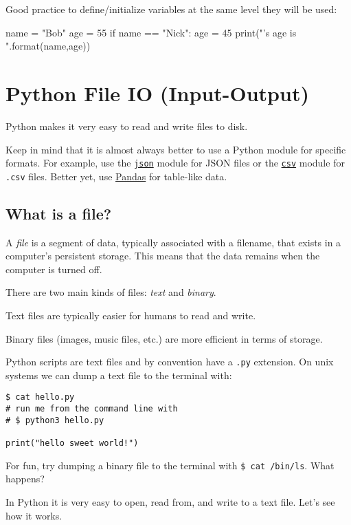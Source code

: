 \documentclass[12pt]{article} \newif\ifsolution\solutiontrue %
\begin{document}
Good practice to define/initialize variables at the same level they will
be used:

\begin{python}
name = "Bob" age = 55 if name == "Nick":     age = 45  print("{}'s age is {}".format(name,age))
\end{python}


\section{Python File IO
(Input-Output)}\label{python-file-io-input-output}

Python makes it very easy to read and write files to disk.

Keep in mind that it is almost always better to use a Python module for
specific formats. For example, use the
\href{https://docs.python.org/3/library/json.html}{\texttt{json}} module
for JSON files or the
\href{https://docs.python.org/3/library/csv.html}{\texttt{csv}} module
for \texttt{.csv} files. Better yet, use
\href{http://pandas.pydata.org/}{Pandas} for table-like data.

\subsection{What is a file?}\label{what-is-a-file}

A \emph{file} is a segment of data, typically associated with a
filename, that exists in a computer's persistent storage. This means
that the data remains when the computer is turned off.

There are two main kinds of files: \emph{text} and \emph{binary}.

Text files are typically easier for humans to read and write.

Binary files (images, music files, etc.) are more efficient in terms of
storage.

Python scripts are text files and by convention have a \texttt{.py}
extension. On unix systems we can dump a text file to the terminal with:

\begin{verbatim}
$ cat hello.py
# run me from the command line with
# $ python3 hello.py

print("hello sweet world!")
\end{verbatim}

For fun, try dumping a binary file to the terminal with
\texttt{\$\ cat\ /bin/ls}. What happens?

In Python it is very easy to open, read from, and write to a text file.
Let's see how it works.
\end{document}
